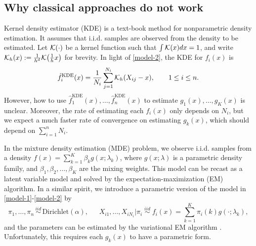 \documentclass[preprint,11pt]{article}
\numberwithin{equation}{section}
\newcommand{\beq}{\begin{equation}}
\newcommand{\eeq}{\end{equation}}
\begin{document}
\subsection{Why classical approaches do not work}
Kernel density estimator (KDE) is a text-book method for nonparametric density estimation. It assumes that i.i.d. samples are observed from the density to be estimated. 
Let ${\cal K}(\cdot)$ be a kernel function such that $\int {\cal K}(x)dx=1$, and write ${\cal K}_h(x):= \frac{1}{h^d}{\cal K}\bigl(\frac{1}{h}x \bigr)$ for brevity. 
In light of \eqref{model-2}, the KDE for $f_i(x)$ is 
\beq \label{KDE-fi}
\hat{f}_i^{\text{KDE}}(x) =\frac{1}{N_i}\sum_{j=1}^{N_i} {\cal K}_h(X_{ij}-x), \qquad 1\leq i\leq n.   
\eeq 
However, how to use $\hat{f}_1^{\text{KDE}}(x), \ldots, \hat{f}_n^{\text{KDE}}(x)$ to estimate $g_1(x), \ldots, g_K(x)$ is unclear. 
Moreover, the rate of estimating each $f_i(x)$ only depends on $N_i$, but we expect a much faster rate of convergence on estimating $g_k(x)$, which should depend on $\sum_{i=1}^n N_i$. 


In the mixture density estimation (MDE) problem, we observe i.i.d. samples from a density 
$f(x)=\sum_{k=1}^K \beta_k g(x; \lambda_k)$, where $g(x;\lambda)$ is a parametric density family, and $\beta_1,\beta_2,\ldots,\beta_K$ are the mixing weights. This model can be recast as a latent variable model 
and solved by the expectation-maximization (EM) algorithm. 
In a similar spirit, we introduce a parametric version of the model in \eqref{model-1}-\eqref{model-2} by 
\beq \label{NMDE-to-latentV}
\pi_1, \ldots,\pi_n \, \overset{iid}{\sim}\, \mathrm{Dirichlet}(\alpha), \quad\;\; X_{i1}, \ldots, X_{iN_i} | \pi_i \; \overset{iid}{\sim}\;  f_i(x)=\sum_{k=1}^K \pi_i(k) g(\cdot; \lambda_k), 
\eeq
and the parameters can be estimated by the variational EM algorithm  \citep{blei2004variational}.
Unfortunately, 
this requires each $g_k(x)$ to have a parametric form.  
\end{document}
